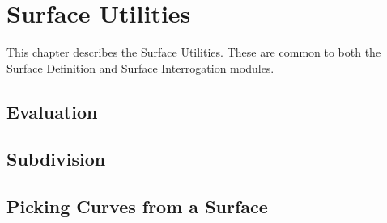 \chapter{Surface Utilities}
\label{surfaceutilities}
This chapter describes the Surface Utilities. These are common to both
the Surface Definition and Surface Interrogation modules.


\pgsbreak
\section{Evaluation}

\pgsbreak

\pgsbreak

\pgsbreak

\pgsbreak

\pgsbreak
\section{Subdivision}

\pgsbreak

\pgsbreak
\section{Picking Curves from a Surface}

\pgsbreak

\pgsbreak

\pgsbreak

\pgsbreak


